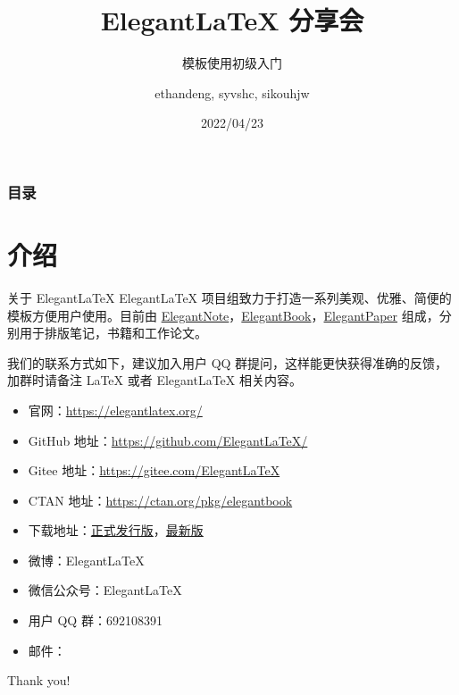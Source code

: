 \documentclass[9pt]{beamer}
\author{ethandeng, syvshc, sikouhjw}
\title{Elegant\LaTeX{} 分享会}
\subtitle{模板使用初级入门}
\institute{ElegantLaTeX Program}
\date{2022/04/23}
\begin{document}
\maketitle


\begin{frame}\frametitle{目录}
\tableofcontents
\end{frame}


\section{介绍}

\begin{frame}{关于 ElegantLaTeX}
Elegant\LaTeX{} 项目组致力于打造一系列美观、优雅、简便的模板方便用户使用。目前由 \href{https://github.com/ElegantLaTeX/ElegantNote}{ElegantNote}，\href{https://github.com/ElegantLaTeX/ElegantBook}{ElegantBook}，\href{https://github.com/ElegantLaTeX/ElegantPaper}{ElegantPaper} 组成，分别用于排版笔记，书籍和工作论文。

我们的联系方式如下，建议加入用户 QQ 群提问，这样能更快获得准确的反馈，加群时请备注 \LaTeX{} 或者 Elegant\LaTeX{} 相关内容。
\begin{itemize}
  \item 官网：\href{https://elegantlatex.org/}{https://elegantlatex.org/}
  \item GitHub 地址：\href{https://github.com/ElegantLaTeX/}{https://github.com/ElegantLaTeX/}
  \item Gitee 地址：\href{https://gitee.com/ElegantLaTeX}{https://gitee.com/ElegantLaTeX}
  \item CTAN 地址：\href{https://ctan.org/pkg/elegantbook}{https://ctan.org/pkg/elegantbook}
  \item 下载地址：\href{https://github.com/ElegantLaTeX/ElegantBook/releases}{正式发行版}，\href{https://github.com/ElegantLaTeX/ElegantBook/archive/master.zip}{最新版}
  \item 微博：Elegant\LaTeX{}
  \item 微信公众号：Elegant\LaTeX{}
  \item 用户 QQ 群：692108391
  \item 邮件：
\end{itemize}
\end{frame}


\begin{frame}[standout]
  Thank you!
\end{frame}
\end{document}
